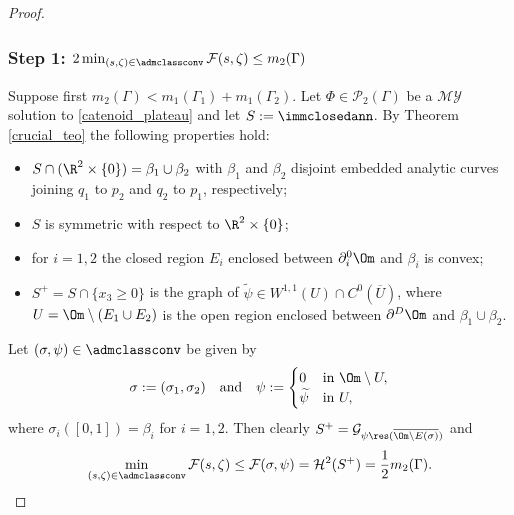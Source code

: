 \skpt
\begin{proof}\vspace*{-.5\baselineskip}
\subsubsection*{Step 1:
$2\min_{(s,\zeta)\in \admclassconv}\mathcal F(s,\zeta)\le m_2(\Gamma)$}

Suppose first $m_2(\Gamma)<m_1(\Gamma_1)+m_1(\Gamma_2)$.
Let $\Phi\in\mathcal{P}_2(\Gamma)$ be a $\mathcal{MY}$ solution to \eqref{catenoid_plateau} and let $S:=\immclosedann$. By Theorem \ref{crucial_teo} the following properties hold:
\begin{itemize}
\item $S\cap(\R^2\times\{0\})=\beta_1\cup\beta_2$ with $\beta_1$ and $\beta_2$ disjoint
embedded analytic curves joining $q_1$ to $p_2$ and $q_2$ to $p_1$, respectively;
\item $S$ is symmetric with respect to $\R^2\times\{0\}$;
\item for $i=1,2$ the closed
region $E_i$ enclosed between $\partial^0_i\Om$ and $\beta_i$ is convex;
\item $S^+=S\cap\{x_3\ge0\}$ is the graph of $\widetilde\psi\in W^{1,1}(U)\cap C^0(\overline U)$, where $U=\Om\setminus( E_1\cup E_2)$ is the open
region enclosed between $\partial^D\Om$ and $\beta_1\cup\beta_2$.
\end{itemize}
Let $(\sigma,\psi)\in\admclassconv$ be given by
\begin{equation*}
\sigma:=(\sigma_1,\sigma_2)\quad\text{and}\quad\psi:=\begin{cases}
0&\text{in } \Om\setminus U,
\\
\widetilde{\psi}&\text{in } U,
\end{cases}
\end{equation*}
where $\sigma_i([0,1])=\beta_i$ for $i=1,2$.
Then clearly $S^+=\mathcal{G}_{\psi\res(\overline{\Om\setminus E(\sigma)})}$ and
\begin{equation*}
\min_{(s,\zeta)\in\admclassconv}\mathcal{F}(s,\zeta)\le \mathcal{F}(\sigma,\psi)=\mathcal{H}^2(S^+)=\frac12m_2(\Gamma).
\end{equation*}


\end{proof}
